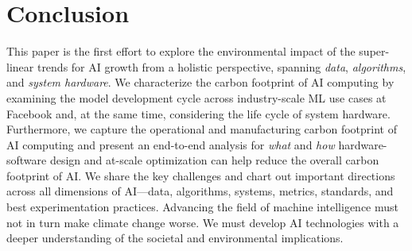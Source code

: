 \section{Conclusion}
\label{sec:conclusion}

This paper is the first effort to explore the environmental impact of the super-linear trends for AI growth from a holistic perspective, spanning \textit{data}, \textit{algorithms}, and \textit{system hardware}. We characterize the carbon footprint of AI computing by examining the model development cycle across industry-scale ML use cases at Facebook and, at the same time, considering the life cycle of system hardware. Furthermore, we capture the operational and manufacturing carbon footprint of AI computing and present an end-to-end analysis for \textit{what} and \textit{how} hardware-software design and at-scale optimization can help reduce the overall carbon footprint of AI. We share the key challenges and chart out important directions across all dimensions of AI---data, algorithms, systems, metrics, standards, and best experimentation practices.
Advancing the field of machine intelligence must not in turn make climate change worse. We must develop AI technologies with a deeper understanding of the societal and environmental implications.

